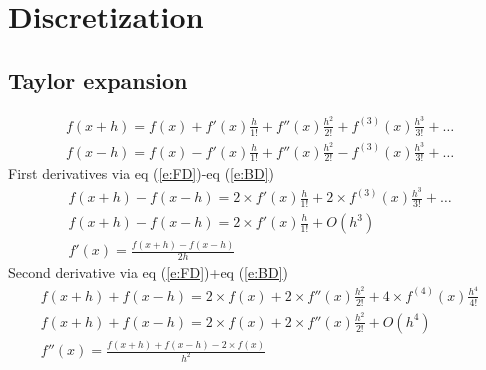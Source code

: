 \documentclass[11pt,dvips]{article}
\numberwithin{equation}{section}
\begin{document}
\section{Discretization}
\subsection{Taylor expansion \cite{ferziger_numerical_1981}}
%
\begin{gather}
f(x+h)=f(x)+f'(x)\frac{h}{1!}+f''(x)\frac{h^2}{2!}+f^{(3)}(x)\frac{h^3}{3!}+ \ldots  \label{e:FD} \\
f(x-h)=f(x)-f'(x)\frac{h}{1!}+f''(x)\frac{h^2}{2!}-f^{(3)}(x)\frac{h^3}{3!}+ \ldots  \label{e:BD} 
\end{gather}
%
First derivatives via eq (\ref{e:FD})-eq (\ref{e:BD})
%
\begin{gather}
f(x+h)-f(x-h)=2\times f'(x)\frac{h}{1!}+2 \times f^{(3)}(x)\frac{h^3}{3!}+ \ldots \nonumber \\
f(x+h)-f(x-h)=2\times f'(x)\frac{h}{1!}+O(h^3) \nonumber \\
f'(x)=\frac{f(x+h)-f(x-h)}{2h}  \label{e:f_1d}
\end{gather}
%
Second derivative via eq (\ref{e:FD})+eq (\ref{e:BD})
%
\begin{gather}
f(x+h)+f(x-h)=2\times f(x)+2 \times f''(x)\frac{h^2}{2!}+4 \times f^{(4)}(x)
\frac{h^4}{4!} \nonumber \\
f(x+h)+f(x-h)=2\times f(x)+2 \times f''(x)\frac{h^2}{2!}+O(h^4) \nonumber \\
f''(x)=\frac{f(x+h)+f(x-h)-2\times f(x)}{h^2} \label{e:f_2d}
\end{gather}
%
\end{document}
